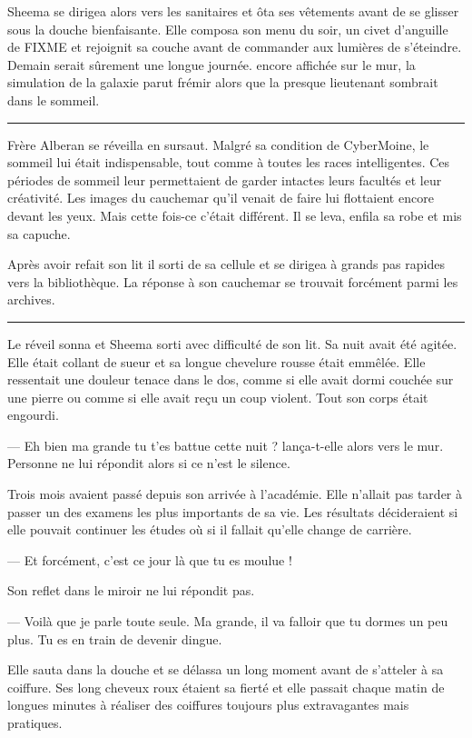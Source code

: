\documentclass[ebook,12pt,oneside,onecolumn,openright,draft]{memoir}
\begin{document}
Sheema se dirigea alors vers les sanitaires et ôta ses vêtements avant de se
glisser sous la douche bienfaisante. Elle composa son menu du soir, un civet
d'anguille de FIXME et rejoignit sa couche avant de commander aux lumières de
s'éteindre. Demain serait sûrement une longue journée. encore affichée sur le
mur, la simulation de la galaxie parut frémir alors que la presque lieutenant
sombrait dans le sommeil.

\fancybreak{\pfbreakdisplay}

Frère Alberan se réveilla en sursaut. Malgré sa condition de CyberMoine, le
sommeil lui était indispensable, tout comme à toutes les races intelligentes.
Ces périodes de sommeil leur permettaient de garder intactes leurs facultés et
leur créativité. Les images du cauchemar qu'il venait de faire lui flottaient
encore devant les yeux. Mais cette fois-ce c'était différent. Il se leva, enfila
sa robe et mis sa capuche.

Après avoir refait son lit il sorti de sa cellule et se dirigea à grands pas
rapides vers la bibliothèque. La réponse à son cauchemar se trouvait forcément
parmi les archives.

\fancybreak{\pfbreakdisplay}

Le réveil sonna et Sheema sorti avec difficulté de son lit. Sa nuit
avait été agitée. Elle était collant de sueur et sa longue chevelure rousse
était emmêlée. Elle ressentait une douleur tenace dans le dos, comme si elle
avait dormi couchée sur une pierre ou comme si elle avait reçu un coup violent.
Tout son corps était engourdi.

— Eh bien ma grande tu t'es battue cette nuit ? lança-t-elle alors vers le mur.
Personne ne lui répondit alors si ce n'est le silence.

Trois mois avaient passé depuis son arrivée à l'académie. Elle n'allait pas
tarder à passer un des examens les plus importants de sa vie. Les résultats
décideraient si elle pouvait continuer les études où si il fallait qu'elle
change de carrière.

 — Et forcément, c'est ce jour là que tu es moulue !

Son reflet dans le miroir ne lui répondit pas.

— Voilà que je parle toute seule. Ma grande, il va falloir que tu dormes un peu
plus. Tu es en train de devenir dingue.

Elle sauta dans la douche et se délassa un long moment avant de s'atteler à sa
coiffure. Ses long cheveux roux étaient sa fierté et elle passait chaque matin
de longues minutes à réaliser des coiffures toujours plus extravagantes mais
pratiques.
\end{document}
